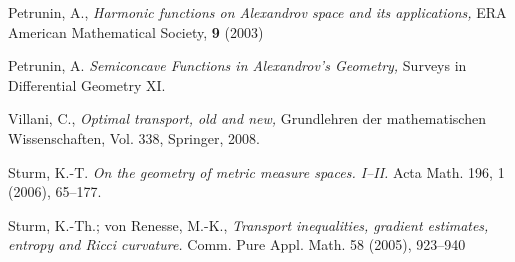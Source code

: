 \documentclass[oneside,a4paper]{article}
\begin{document}
\begin{thebibliography}{3}
 Petrunin, A., \textit{Harmonic functions on Alexandrov space and its applications,} ERA American Mathematical Society, \textbf{9} (2003)


 Petrunin, A.  \textit{Semiconcave Functions in Alexandrov's Geometry,} Surveys in Differential Geometry XI.

 Villani, C., \textit{Optimal transport, old and new,} Grundlehren der mathematischen Wissenschaften, Vol. 338, Springer, 2008.

 Sturm, K.-T. \textit{On the geometry of metric measure spaces. I--II.} Acta Math. 196, 1 (2006), 65--177.

  Sturm, K.-Th.;  von Renesse, M.-K., \textit{Transport inequalities, gradient estimates,
entropy and Ricci curvature.}
Comm. Pure Appl. Math. 58 (2005), 923--940


\end{thebibliography}
\end{document}
